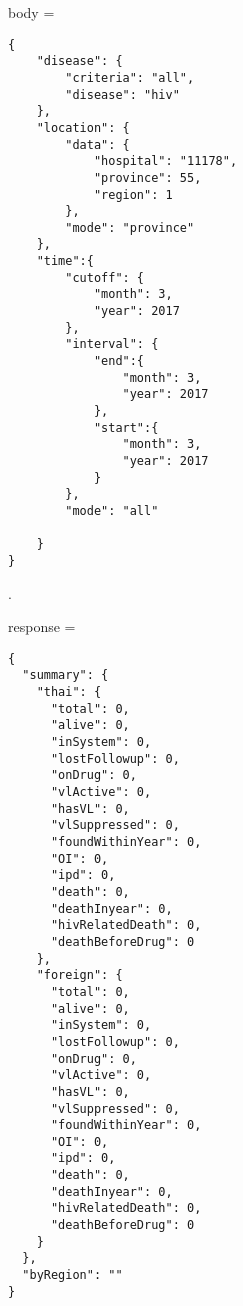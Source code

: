 \begin{multicols}{2}
body = 
\begin{verbatim}
{
	"disease": {
		"criteria": "all",
		"disease": "hiv"
	},
	"location": {
		"data": {
			"hospital": "11178",
			"province": 55,
			"region": 1
		},
		"mode": "province"
	},
	"time":{
		"cutoff": {
			"month": 3,
			"year": 2017
		},
		"interval": {
			"end":{
				"month": 3,
				"year": 2017
			},
			"start":{
				"month": 3,
				"year": 2017
			}
		},
		"mode": "all"
		
	}
}
\end{verbatim}
.
\columnbreak

response =
\begin{verbatim}
{
  "summary": {
    "thai": {
      "total": 0,
      "alive": 0,
      "inSystem": 0,
      "lostFollowup": 0,
      "onDrug": 0,
      "vlActive": 0,
      "hasVL": 0,
      "vlSuppressed": 0,
      "foundWithinYear": 0,
      "OI": 0,
      "ipd": 0,
      "death": 0,
      "deathInyear": 0,
      "hivRelatedDeath": 0,
      "deathBeforeDrug": 0
    },
    "foreign": {
      "total": 0,
      "alive": 0,
      "inSystem": 0,
      "lostFollowup": 0,
      "onDrug": 0,
      "vlActive": 0,
      "hasVL": 0,
      "vlSuppressed": 0,
      "foundWithinYear": 0,
      "OI": 0,
      "ipd": 0,
      "death": 0,
      "deathInyear": 0,
      "hivRelatedDeath": 0,
      "deathBeforeDrug": 0
    }
  },
  "byRegion": ""
}
\end{verbatim}
\end{multicols}